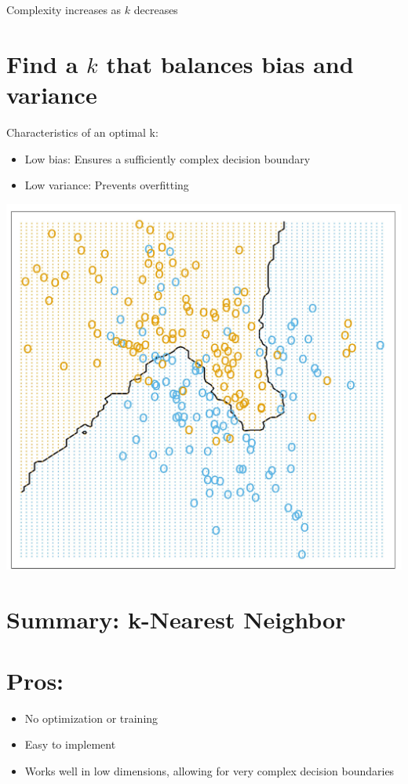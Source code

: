 \documentclass[10pt]{article}
\begin{document}
Complexity increases as $k$ decreases

\section*{Find a $k$ that balances bias and variance}
Characteristics of an optimal k:

\begin{itemize}
  \item Low bias: Ensures a sufficiently complex decision boundary
  \item Low variance: Prevents overfitting
\end{itemize}

\begin{center}
\includegraphics[max width=\textwidth]{2023_12_30_f937b0007b5d87b39f79g-24}
\end{center}

\section*{Summary: k-Nearest Neighbor}
\section*{Pros:}
\begin{itemize}
  \item No optimization or training
  \item Easy to implement
  \item Works well in low dimensions, allowing for very complex decision boundaries
\end{itemize}
\end{document}
